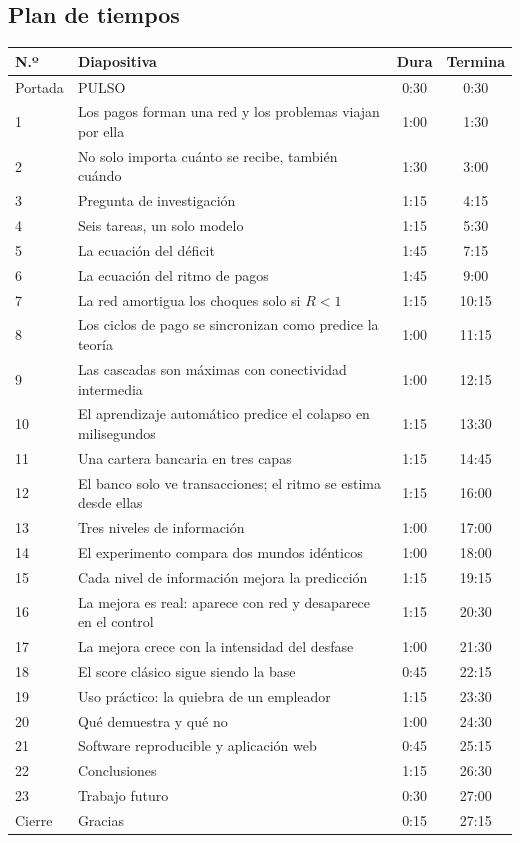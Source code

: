 \subsection{Plan de tiempos}
\begin{center}
\small
\begin{longtable}{lp{}cc}
\toprule
\textbf{N.º} & \textbf{Diapositiva} & \textbf{Dura} & \textbf{Termina} \\
\midrule
\endhead
Portada & PULSO & 0:30 & 0:30 \\
1 & Los pagos forman una red y los problemas viajan por ella & 1:00 & 1:30 \\
2 & No solo importa cuánto se recibe, también cuándo & 1:30 & 3:00 \\
3 & Pregunta de investigación & 1:15 & 4:15 \\
4 & Seis tareas, un solo modelo & 1:15 & 5:30 \\
5 & La ecuación del déficit & 1:45 & 7:15 \\
6 & La ecuación del ritmo de pagos & 1:45 & 9:00 \\
7 & La red amortigua los choques solo si $R<1$ & 1:15 & 10:15 \\
8 & Los ciclos de pago se sincronizan como predice la teoría & 1:00 & 11:15 \\
9 & Las cascadas son máximas con conectividad intermedia & 1:00 & 12:15 \\
10 & El aprendizaje automático predice el colapso en milisegundos & 1:15 & 13:30 \\
11 & Una cartera bancaria en tres capas & 1:15 & 14:45 \\
12 & El banco solo ve transacciones; el ritmo se estima desde ellas & 1:15 & 16:00 \\
13 & Tres niveles de información & 1:00 & 17:00 \\
14 & El experimento compara dos mundos idénticos & 1:00 & 18:00 \\
15 & Cada nivel de información mejora la predicción & 1:15 & 19:15 \\
16 & La mejora es real: aparece con red y desaparece en el control & 1:15 & 20:30 \\
17 & La mejora crece con la intensidad del desfase & 1:00 & 21:30 \\
18 & El score clásico sigue siendo la base & 0:45 & 22:15 \\
19 & Uso práctico: la quiebra de un empleador & 1:15 & 23:30 \\
20 & Qué demuestra y qué no & 1:00 & 24:30 \\
21 & Software reproducible y aplicación web & 0:45 & 25:15 \\
22 & Conclusiones & 1:15 & 26:30 \\
23 & Trabajo futuro & 0:30 & 27:00 \\
Cierre & Gracias & 0:15 & 27:15 \\
\bottomrule
\end{longtable}
\end{center}

